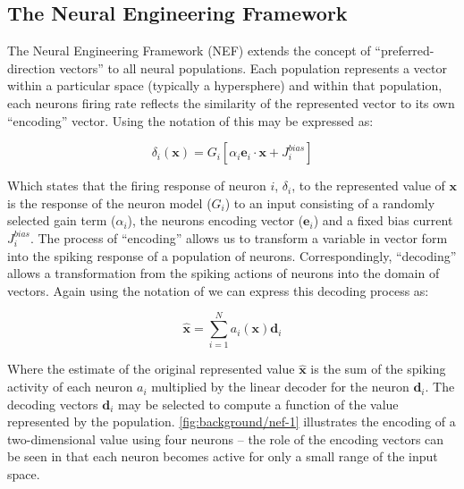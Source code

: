 \documentclass[conference]{IEEEtran}
\renewcommand{\vec}{\mathbf}  %
\begin{document}
  \subsection{The Neural Engineering Framework}
  \label{sef:background/nef}

The Neural Engineering Framework (NEF) extends the concept of ``preferred-direction vectors'' \parencite{} to all neural populations. Each population represents a vector within a particular space (typically a hypersphere) and within that population, each neurons firing rate reflects the similarity of the represented vector to its own ``encoding'' vector. Using the notation of \textcite{Stewart2014} this may be expressed as:

\begin{equation}
  \delta_{i}\left(\vec{x}\right) = G_{i}\left[ \alpha_i \vec{e}_i \cdot \vec{x} + J^{bias}_i \right]
  \label{eq:encoding}
\end{equation}

Which states that the firing response of neuron $i$, $\delta_i$, to the represented value of $\vec{x}$ is the response of the neuron model ($G_{i}$) to an input consisting of a randomly selected gain term ($\alpha_i$), the neurons encoding vector ($\vec{e}_i$) and a fixed bias current $J^{bias}_i$. The process of ``encoding'' allows us to transform a variable in vector form into the spiking response of a population of neurons. Correspondingly, ``decoding'' allows a transformation from the spiking actions of neurons into the domain of vectors. Again using the notation of \textcite{Stewart2014} we can express this decoding process as:

\begin{equation}
  \vec{\hat{x}} = \sum\limits_{i=1}^{N} a_i(\vec{x})\vec{d}_i  \label{eq:decoding}
\end{equation}

Where the estimate of the original represented value $\vec{\hat{x}}$ is the sum of the spiking activity of each neuron $a_i$ multiplied by the linear decoder for the neuron $\vec{d}_i$. The decoding vectors $\vec{d}_i$ may be selected to compute a function of the value represented by the population. \figurename \ref{fig:background/nef-1} illustrates the encoding of a two-dimensional value using four neurons -- the role of the encoding vectors can be seen in that each neuron becomes active for only a small range of the input space.
\end{document}
